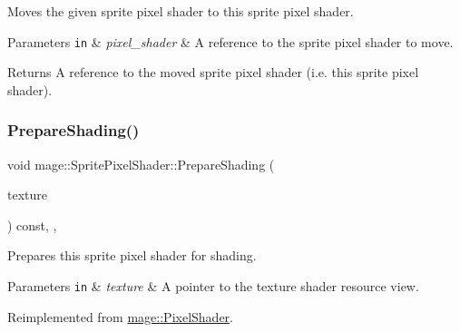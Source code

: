 Moves the given sprite pixel shader to this sprite pixel shader.


\begin{DoxyParams}[1]{Parameters}
\mbox{\tt in}  & {\em pixel\+\_\+shader} & A reference to the sprite pixel shader to move. \\
\hline
\end{DoxyParams}
\begin{DoxyReturn}{Returns}
A reference to the moved sprite pixel shader (i.\+e. this sprite pixel shader). 
\end{DoxyReturn}
\hypertarget{classmage_1_1_sprite_pixel_shader_a8c0c4daf36c74822a772b1a38e8d876a}{}\label{classmage_1_1_sprite_pixel_shader_a8c0c4daf36c74822a772b1a38e8d876a} 
\subsubsection{\texorpdfstring{Prepare\+Shading()}{PrepareShading()}}
{\footnotesize\ttfamily void mage\+::\+Sprite\+Pixel\+Shader\+::\+Prepare\+Shading (\begin{DoxyParamCaption}\item[{I\+D3\+D11\+Shader\+Resource\+View $\ast$}]{texture }\end{DoxyParamCaption}) const\hspace{0.3cm}{\ttfamily [final]}, {\ttfamily [override]}, {\ttfamily [virtual]}}

Prepares this sprite pixel shader for shading.


\begin{DoxyParams}[1]{Parameters}
\mbox{\tt in}  & {\em texture} & A pointer to the texture shader resource view. \\
\hline
\end{DoxyParams}


Reimplemented from \hyperlink{classmage_1_1_pixel_shader_ab677013145ca252c57e5a001134c01ff}{mage\+::\+Pixel\+Shader}.

